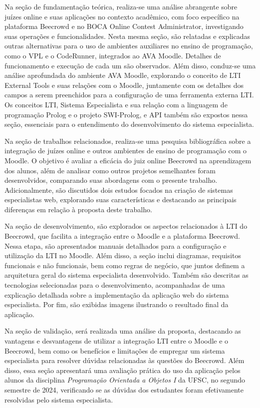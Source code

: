 Na seção de fundamentação teórica, realiza-se uma análise abrangente sobre juízes online e suas aplicações no contexto acadêmico, com foco específico na plataforma Beecrowd e no BOCA Online Contest Administrator, investigando suas operações e funcionalidades. Nesta mesma seção, são relatadas e explicadas outras alternativas para o uso de ambientes auxiliares no ensino de programação, como o VPL e o CodeRunner, integrados ao AVA Moodle. Detalhes de funcionamento e execução de cada um são observados. Além disso, conduz-se uma análise aprofundada do ambiente AVA Moodle, explorando o conceito de LTI External Tools e suas relações com o Moodle, juntamente com os detalhes dos campos a serem preenchidos para a configuração de uma ferramenta externa LTI. Os conceitos LTI, Sistema Especialista e sua relação com a linguagem de programação Prolog e o projeto SWI-Prolog, e API também são expostos nessa seção, essenciais para o entendimento do desenvolvimento do sistema especialista. 

Na seção de trabalhos relacionados, realiza-se uma pesquisa bibliográfica sobre a integração de juízes online e outros ambientes de ensino de programação com o Moodle. O objetivo é avaliar a eficácia do juiz online Beecrowd na aprendizagem dos alunos, além de analisar como outros projetos semelhantes foram desenvolvidos, comparando suas abordagens com o presente trabalho. Adicionalmente, são discutidos dois estudos focados na criação de sistemas especialistas web, explorando suas características e destacando as principais diferenças em relação à proposta deste trabalho.

Na seção de desenvolvimento, são explorados os aspectos relacionados à LTI do Beecrowd, que facilita a integração entre o Moodle e a plataforma Beecrowd. Nessa etapa, são apresentados manuais detalhados para a configuração e utilização da LTI no Moodle. Além disso, a seção inclui diagramas, requisitos funcionais e não funcionais, bem como regras de negócio, que juntos definem a arquitetura geral do sistema especialista desenvolvido. Também são descritas as tecnologias selecionadas para o desenvolvimento, acompanhadas de uma explicação detalhada sobre a implementação da aplicação web do sistema especialista. Por fim, são exibidas imagens ilustrando o resultado final da aplicação.

Na seção de validação, será realizada uma análise da proposta, destacando as vantagens e desvantagens de utilizar a integração LTI entre o Moodle e o Beecrowd, bem como os benefícios e limitações de empregar um sistema especialista para resolver dúvidas relacionadas às questões do Beecrowd. Além disso, essa seção apresentará uma avaliação prática do uso da aplicação pelos alunos da disciplina \textit{Programação Orientada a Objetos I} da UFSC, no segundo semestre de 2024, verificando se as dúvidas dos estudantes foram efetivamente resolvidas pelo sistema especialista.

